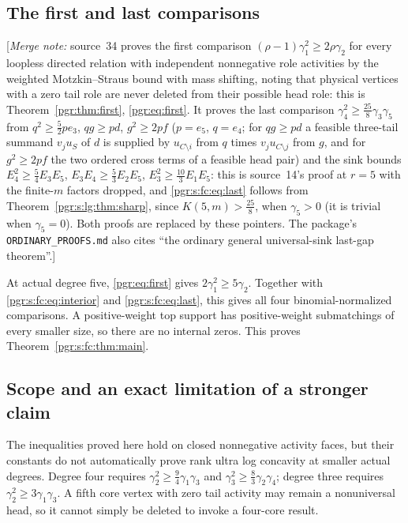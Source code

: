 \documentclass[11pt]{article}
\numberwithin{equation}{section}
\theoremstyle{definition}\newtheorem{definition}[theorem]{Definition}\newtheorem{remark}[theorem]{Remark}
\newcommand{\mnote}[1]{[\textit{Merge note:} #1]}
\begin{document}
\subsection{The first and last comparisons}

\mnote{source~34 proves the first comparison $(\rho-1)\gamma_1^2\ge2\rho\gamma_2$
for every loopless directed relation with independent nonnegative role
activities by the weighted Motzkin--Straus bound with mass shifting,
noting that physical vertices with a zero tail role are never deleted from
their possible head role: this is Theorem~\ref{pgr:thm:first},
\eqref{pgr:eq:first}. It proves the last comparison
$\gamma_4^2\ge\frac{25}{8}\gamma_3\gamma_5$ from $q^2\ge\frac52pe_3$,
$qg\ge pd$, $g^2\ge2pf$ ($p=e_5$, $q=e_4$; for $qg\ge pd$ a feasible
three-tail summand $v_ju_S$ of $d$ is supplied by $u_{C\setminus i}$ from
$q$ times $v_ju_{C\setminus j}$ from $g$, and for $g^2\ge2pf$ the two
ordered cross terms of a feasible head pair) and the sink bounds
$E_4^2\ge\frac54E_3E_5$, $E_3E_4\ge\frac53E_2E_5$,
$E_3^2\ge\frac{10}{3}E_1E_5$: this is source~14's proof at $r=5$ with the
finite-$m$ factors dropped, and \eqref{pgr:s:fc:eq:last} follows from
Theorem~\ref{pgr:s:lg:thm:sharp}, since $K(5,m)>\frac{25}{8}$, when
$\gamma_5>0$ (it is trivial when $\gamma_5=0$). Both proofs are replaced
by these pointers. The package's \texttt{ORDINARY\_PROOFS.md} also cites
``the ordinary general universal-sink last-gap theorem''.}

At actual degree five, \eqref{pgr:eq:first} gives $2\gamma_1^2\ge5\gamma_2$.
Together with \eqref{pgr:s:fc:eq:interior} and \eqref{pgr:s:fc:eq:last}, this gives all four binomial-normalized comparisons. A positive-weight top support has positive-weight submatchings of every smaller size, so there are no internal zeros. This proves Theorem~\ref{pgr:s:fc:thm:main}.

\subsection{Scope and an exact limitation of a stronger claim}
The inequalities proved here hold on closed nonnegative activity faces, but their constants do not automatically prove rank ultra log concavity at smaller actual degrees. Degree four requires $\gamma_2^2\ge\tfrac94\gamma_1\gamma_3$ and $\gamma_3^2\ge\tfrac83\gamma_2\gamma_4$; degree three requires $\gamma_2^2\ge3\gamma_1\gamma_3$. A fifth core vertex with zero tail activity may remain a nonuniversal head, so it cannot simply be deleted to invoke a four-core result.
\end{document}
